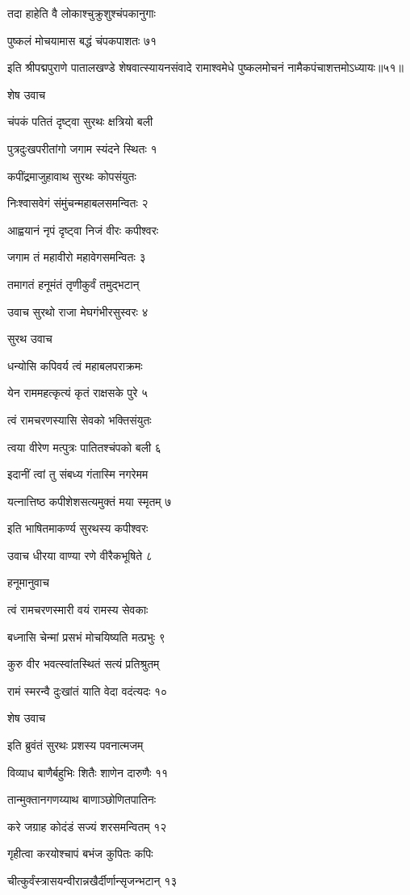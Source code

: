 तदा हाहेति वै लोकाश्चुक्रुशुश्चंपकानुगाः

पुष्कलं मोचयामास बद्धं चंपकपाशतः ७१

इति श्रीपद्मपुराणे पातालखण्डे शेषवात्स्यायनसंवादे रामाश्वमेधे पुष्कलमोचनं नामैकपंचाशत्तमोऽध्यायः॥५१॥


शेष उवाच

चंपकं पतितं दृष्ट्वा सुरथः क्षत्रियो बली

पुत्रदुःखपरीतांगो जगाम स्यंदने स्थितः १

कपींद्रमाजुहावाथ सुरथः कोपसंयुतः

निःश्वासवेगं संमुंचन्महाबलसमन्वितः २

आह्वयानं नृपं दृष्ट्वा निजं वीरः कपीश्वरः

जगाम तं महावीरो महावेगसमन्वितः ३

तमागतं हनूमंतं तृणीकुर्वं तमुद्भटान्

उवाच सुरथो राजा मेघगंभीरसुस्वरः ४

सुरथ उवाच

धन्योसि कपिवर्य त्वं महाबलपराक्रमः

येन राममहत्कृत्यं कृतं राक्षसके पुरे ५

त्वं रामचरणस्यासि सेवको भक्तिसंयुतः

त्वया वीरेण मत्पुत्रः पातितश्चंपको बली ६

इदानीं त्वां तु संबध्य गंतास्मि नगरेमम

यत्नात्तिष्ठ कपीशेशसत्यमुक्तं मया स्मृतम् ७

इति भाषितमाकर्ण्य सुरथस्य कपीश्वरः

उवाच धीरया वाण्या रणे वीरैकभूषिते ८

हनूमानुवाच

त्वं रामचरणस्मारी वयं रामस्य सेवकाः

बध्नासि चेन्मां प्रसभं मोचयिष्यति मत्प्रभुः ९

कुरु वीर भवत्स्वांतस्थितं सत्यं प्रतिश्रुतम्

रामं स्मरन्वै दुःखांतं याति वेदा वदंत्यदः १०

शेष उवाच

इति ब्रुवंतं सुरथः प्रशस्य पवनात्मजम्

विव्याध बाणैर्बहुभिः शितैः शाणेन दारुणैः ११

तान्मुक्तानगणय्याथ बाणाञ्छोणितपातिनः

करे जग्राह कोदंडं सज्यं शरसमन्वितम् १२

गृहीत्वा करयोश्चापं बभंज कुपितः कपिः

चीत्कुर्वंस्त्रासयन्वीरान्नखैर्दीर्णान्सृजन्भटान् १३

